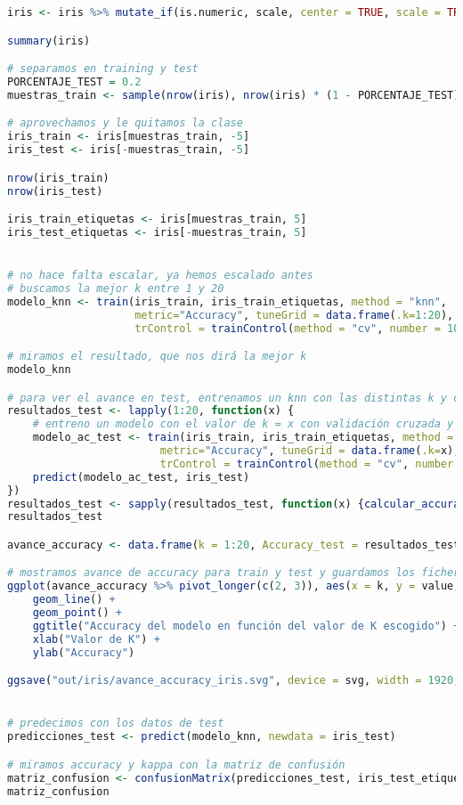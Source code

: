 \begin{lstlisting}[language=R]
iris <- iris %>% mutate_if(is.numeric, scale, center = TRUE, scale = TRUE)

summary(iris)

# separamos en training y test
PORCENTAJE_TEST = 0.2
muestras_train <- sample(nrow(iris), nrow(iris) * (1 - PORCENTAJE_TEST))

# aprovechamos y le quitamos la clase
iris_train <- iris[muestras_train, -5]
iris_test <- iris[-muestras_train, -5]

nrow(iris_train)
nrow(iris_test)

iris_train_etiquetas <- iris[muestras_train, 5]
iris_test_etiquetas <- iris[-muestras_train, 5]


# no hace falta escalar, ya hemos escalado antes
# buscamos la mejor k entre 1 y 20
modelo_knn <- train(iris_train, iris_train_etiquetas, method = "knn",
					metric="Accuracy", tuneGrid = data.frame(.k=1:20),
					trControl = trainControl(method = "cv", number = 10))

# miramos el resultado, que nos dirá la mejor k
modelo_knn

# para ver el avance en test, entrenamos un knn con las distintas k y calculamos su accuracy en test
resultados_test <- lapply(1:20, function(x) {
	# entreno un modelo con el valor de k = x con validación cruzada y predigo con ese modelo
	modelo_ac_test <- train(iris_train, iris_train_etiquetas, method = "knn",
						metric="Accuracy", tuneGrid = data.frame(.k=x),
						trControl = trainControl(method = "cv", number = 10))
	predict(modelo_ac_test, iris_test)
})
resultados_test <- sapply(resultados_test, function(x) {calcular_accuracy(iris_test_etiquetas, x)})
resultados_test

avance_accuracy <- data.frame(k = 1:20, Accuracy_test = resultados_test, Accuracy_train = modelo_knn$results$Accuracy)

# mostramos avance de accuracy para train y test y guardamos los ficheros
ggplot(avance_accuracy %>% pivot_longer(c(2, 3)), aes(x = k, y = value, color = name)) +
	geom_line() +
	geom_point() +
	ggtitle("Accuracy del modelo en función del valor de K escogido") +
	xlab("Valor de K") +
	ylab("Accuracy")

ggsave("out/iris/avance_accuracy_iris.svg", device = svg, width = 1920, height = 1080, units = "px", dpi = 150)


# predecimos con los datos de test
predicciones_test <- predict(modelo_knn, newdata = iris_test)

# miramos accuracy y kappa con la matriz de confusión
matriz_confusion <- confusionMatrix(predicciones_test, iris_test_etiquetas)
matriz_confusion


\end{lstlisting}
